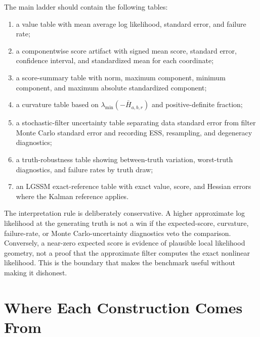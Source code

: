 \documentclass[11pt]{article}
\numberwithin{equation}{section}
\begin{document}
The main ladder should contain the following tables:
\begin{enumerate}[leftmargin=0.28in]
  \item a value table with mean average log likelihood, standard error, and
  failure rate;
  \item a componentwise score artifact with signed mean score, standard error,
  confidence interval, and standardized mean for each coordinate;
  \item a score-summary table with norm, maximum component, minimum component,
  and maximum absolute standardized component;
  \item a curvature table based on
  \(\lambda_{\min}(-\bar H_{a,b,r})\) and positive-definite fraction;
  \item a stochastic-filter uncertainty table separating data standard error
  from filter Monte Carlo standard error and recording ESS, resampling, and
  degeneracy diagnostics;
  \item a truth-robustness table showing between-truth variation, worst-truth
  diagnostics, and failure rates by truth draw;
  \item an LGSSM exact-reference table with exact value, score, and Hessian
  errors where the Kalman reference applies.
\end{enumerate}

The interpretation rule is deliberately conservative.  A higher approximate
log likelihood at the generating truth is not a win if the expected-score,
curvature, failure-rate, or Monte Carlo-uncertainty diagnostics veto the
comparison.  Conversely, a near-zero expected score is evidence of plausible
local likelihood geometry, not a proof that the approximate filter computes the
exact nonlinear likelihood.  This is the boundary that makes the benchmark
useful without making it dishonest.

\section{Where Each Construction Comes From}
\label{sec:p31-source-map}
\end{document}

